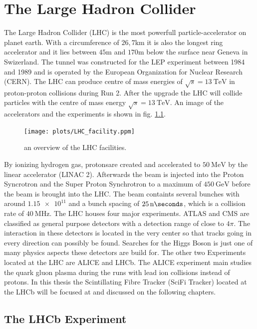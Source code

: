 \chapter{The Large Hadron Collider\cite{lhcInfo}}
\label{sec:lhcb}

The Large Hadron Collider (LHC) is the most powerfull particle-accelerator on planet earth. With a circumference of $26,7\si{\kilo\metre}$ it is also the longest ring accelerator and it lies between $45\si{\metre}$ and $170\si{\metre}$ below the surface near Geneva in Swizerland. The tunnel was constructed for the LEP experiment between 1984 and 1989 and is operated by the European Organization for Nuclear Research (CERN). The LHC can produce centre of mass energies of $\sqrt{s} = \SI{13}{\tera\electronvolt}$ in proton-proton collisions during Run 2. After the upgrade the LHC will collide particles with the centre of mass energy $\sqrt{s} = \SI{13}{\tera\electronvolt}$.
An image of the accelerators and the experiments is shown in fig. \ref{fig:CERN}\cite{facilityCERN}.

\begin{figure}
  \centering
  \texttt{[image: plots/LHC\_facility.ppm]}
  \caption{an overview of the LHC facilities.}
  \label{fig:CERN}
\end{figure}

By ionizing hydrogen gas, protonsare created and accelerated to $\SI{50}{\mega\electronvolt}$ by the linear accelerator (LINAC 2). Afterwards the beam is injected into the Proton Syncrotron and the Super Proton Synchrotron to a maximum of $\SI{450}{\giga\electronvolt}$ before the beam is brought into the LHC.
The beam containts several bunches with around $\num{1.15e11}$ and a bunch spacing of $\SI{25}{\nano\seconds}$, which is a collision rate of $\SI{40}{\mega\hertz}$.
The LHC houses four major experiments. ATLAS and CMS are classified as general purpose detectors with a detection range of close to $4\pi$. The interaction in these detectors is located in the very center so that tracks going in every direction can possibly be found. Searches for the Higgs Boson is just one of many physics aspects these detectors are build for.
The other two Experiments located at the LHC are ALICE and LHCb.
The ALICE experiment main studies the quark gluon plasma during the runs with lead ion collisions instead of protons.
In this thesis the Scintillating Fibre Tracker (SciFi Tracker) located at the LHCb will be focused at and discussed on the following chapters.

\section{The LHCb Experiment\cite{lhcbInfo}}

